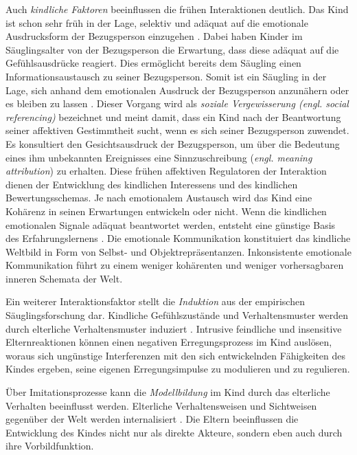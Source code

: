 Auch \textit{kindliche Faktoren} beeinflussen die frühen Interaktionen deutlich. Das Kind ist schon sehr früh in der Lage, selektiv und adäquat auf die emotionale Ausdrucksform der Bezugsperson einzugehen \cite{Harris1994}. Dabei haben Kinder im Säuglingsalter von der Bezugsperson die Erwartung, dass diese adäquat auf die Gefühlsausdrücke reagiert. Dies ermöglicht bereits dem Säugling einen Informationsaustausch zu seiner Bezugsperson. Somit ist ein Säugling in der Lage, sich anhand dem emotionalen Ausdruck der Bezugsperson anzunähern oder es bleiben zu lassen \cite{Resch1999}. Dieser Vorgang wird als \textit{soziale Vergewisserung (\textit{engl. social referencing})} bezeichnet und meint damit, dass ein Kind nach der Beantwortung seiner affektiven Gestimmtheit sucht, wenn es sich seiner Bezugsperson zuwendet. Es konsultiert den Gesichtsausdruck der Bezugsperson, um über die Bedeutung eines ihm unbekannten Ereignisses eine Sinnzuschreibung (\textit{engl. meaning attribution}) zu erhalten. Diese frühen affektiven Regulatoren der Interaktion dienen der Entwicklung des kindlichen Interessens und des kindlichen Bewertungsschemas. Je nach emotionalem Austausch wird das Kind eine Kohärenz in seinen Erwartungen entwickeln oder nicht. Wenn die kindlichen emotionalen Signale adäquat beantwortet werden, entsteht eine günstige Basis des Erfahrungslernens \cite[S.~95]{Resch1999}. Die emotionale Kommunikation konstituiert das kindliche Weltbild in Form von Selbst- und Objektrepräsentanzen. Inkonsistente emotionale Kommunikation führt zu einem weniger kohärenten und weniger vorhersagbaren inneren Schemata der Welt. 

Ein weiterer Interaktionsfaktor stellt die \textit{Induktion} aus der empirischen Säuglingsforschung dar. Kindliche Gefühlszustände und Verhaltensmuster werden durch elterliche Verhaltensmuster induziert \cite{Cummings1994}. Intrusive feindliche und insensitive Elternreaktionen können einen negativen Erregungsprozess im Kind auslösen, woraus sich ungünstige Interferenzen mit den sich entwickelnden Fähigkeiten des Kindes ergeben, seine eigenen Erregungsimpulse zu modulieren und zu regulieren.  

Über Imitationsprozesse kann die \textit{Modellbildung} im Kind durch das elterliche Verhalten beeinflusst werden. Elterliche Verhaltensweisen und Sichtweisen gegenüber der Welt werden internalisiert \cite{Resch1999}. Die Eltern beeinflussen die Entwicklung des Kindes nicht nur als direkte Akteure, sondern eben auch durch ihre Vorbildfunktion. 


